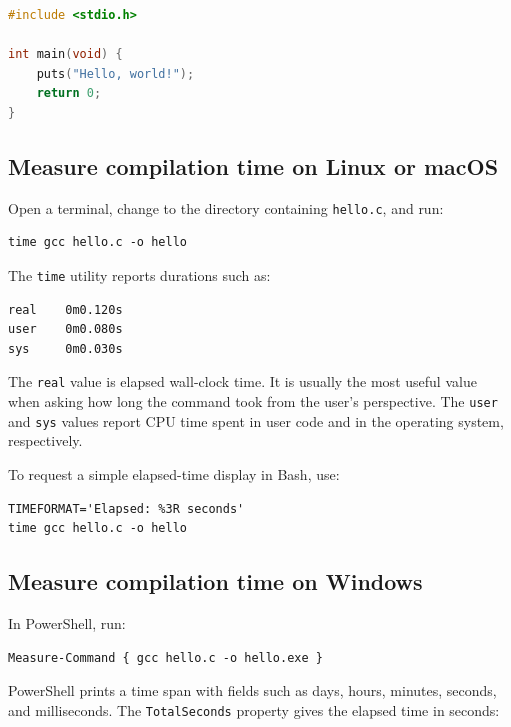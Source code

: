\documentclass[a4paper, 10pt, onepage]{elegantbook}
\begin{document}
{\begin{lstlisting}[language=C]
#include <stdio.h>

int main(void) {
    puts("Hello, world!");
    return 0;
}
\end{lstlisting}

\subsection{Measure compilation time on Linux or macOS}

\noindent

Open a terminal, change to the directory containing \texttt{hello.c}, and run:

\begin{lstlisting}
time gcc hello.c -o hello
\end{lstlisting}

The \texttt{time} utility reports durations such as:

\begin{lstlisting}
real    0m0.120s
user    0m0.080s
sys     0m0.030s
\end{lstlisting}

The \texttt{real} value is elapsed wall-clock time. It is usually the most
useful value when asking how long the command took from the user's
perspective. The \texttt{user} and \texttt{sys} values report CPU time spent
in user code and in the operating system, respectively.  

To request a simple elapsed-time display in Bash, use:

\begin{lstlisting}
TIMEFORMAT='Elapsed: %3R seconds'
time gcc hello.c -o hello
\end{lstlisting}

\subsection{Measure compilation time on Windows}

\noindent

In PowerShell, run:

\begin{lstlisting}
Measure-Command { gcc hello.c -o hello.exe }
\end{lstlisting}

PowerShell prints a time span with fields such as days, hours, minutes,
seconds, and milliseconds. The \texttt{TotalSeconds} property gives the
elapsed time in seconds:

}
\end{document}
